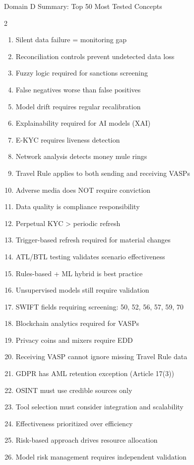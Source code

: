 \documentclass[11pt,a4paper]{beamer}
\begin{document}
\begin{frame}{Domain D Summary: Top 50 Most Tested Concepts}
	\begin{multicols}{2}
		\begin{enumerate}
			\item Silent data failure = monitoring gap
			\item Reconciliation controls prevent undetected data loss
			\item Fuzzy logic required for sanctions screening
			\item False negatives worse than false positives
			\item Model drift requires regular recalibration
			\item Explainability required for AI models (XAI)
			\item E-KYC requires liveness detection
			\item Network analysis detects money mule rings
			\item Travel Rule applies to both sending and receiving VASPs
			\item Adverse media does NOT require conviction
			\item Data quality is compliance responsibility
			\item Perpetual KYC > periodic refresh
			\item Trigger-based refresh required for material changes
			\item ATL/BTL testing validates scenario effectiveness
			\item Rules-based + ML hybrid is best practice
			\item Unsupervised models still require validation
			\item SWIFT fields requiring screening: 50, 52, 56, 57, 59, 70
			\item Blockchain analytics required for VASPs
			\item Privacy coins and mixers require EDD
			\item Receiving VASP cannot ignore missing Travel Rule data
			\item GDPR has AML retention exception (Article 17(3))
			\item OSINT must use credible sources only
			\item Tool selection must consider integration and scalability
			\item Effectiveness prioritized over efficiency
			\item Risk-based approach drives resource allocation
			\item Model risk management requires independent validation

\end{enumerate}
\end{multicols}
\end{frame}
\end{document}
